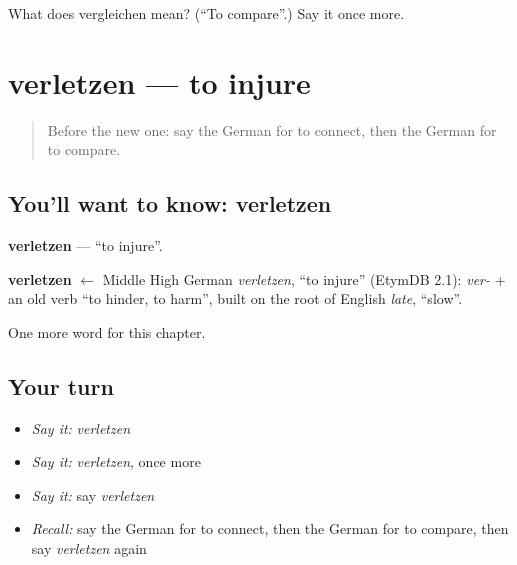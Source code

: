 \begin{tcolorbox}[breakable,colback=teal!4,colframe=teal!35!black,title={Before you move on}]
What does vergleichen mean? (\textquotedblleft{}To compare\textquotedblright{}.) Say it once more.
\end{tcolorbox}
\section[verletzen]{verletzen — to injure}

\label{lesson:GE-C190-verletzen}



\begin{quote}
Before the new one: say the German for to connect, then the German for to compare.
\end{quote}

\subsection*{You'll want to know: verletzen}
\textbf{verletzen} — \textquotedblleft{}to injure\textquotedblright{}.

\begin{cousinweb}
\textbf{verletzen} $\leftarrow$ Middle High German \emph{verletzen}, \textquotedblleft{}to injure\textquotedblright{} (EtymDB 2.1): \emph{ver-} + an old verb \textquotedblleft{}to hinder, to harm\textquotedblright{}, built on the root of English \emph{late}, \textquotedblleft{}slow\textquotedblright{}.
\end{cousinweb}

\begin{grammarlens}[title={What you've built}]
One more word for this chapter.
\end{grammarlens}

\subsection*{Your turn}
\begin{itemize}
\raggedright
  \item \emph{Say it:} \emph{verletzen}
  \item \emph{Say it:} \emph{verletzen}, once more
  \item \emph{Say it:} say \emph{verletzen}
  \item \emph{Recall:} say the German for to connect, then the German for to compare, then say \emph{verletzen} again
\end{itemize}

